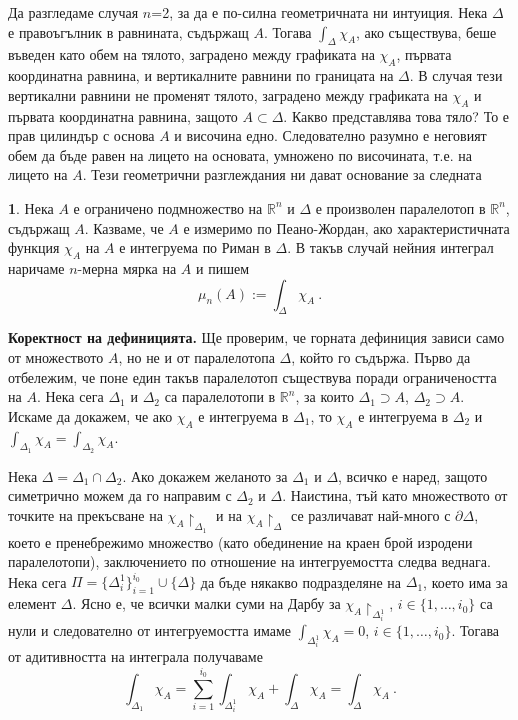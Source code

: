 \documentclass[11pt]{article}
\numberwithin{equation}{section}
\numberwithin{figure}{section}
\numberwithin{table}{section}
\theoremstyle{plain}
\theoremstyle{definition}
\newtheorem{defn}[thm]{\protect\definitionname}
\theoremstyle{remark}
\theoremstyle{definition}
\theoremstyle{remark}
\theoremstyle{plain}
\theoremstyle{definition}
\theoremstyle{definition}
\theoremstyle{plain}
\theoremstyle{plain}
\theoremstyle{plain}
\theoremstyle{definition}
\theoremstyle{plain}
\providecommand{\definitionname}{Дефиниция}
\newcommand*{\R}{\mathbb{R}}
\begin{document}
Да разгледаме случая $n$=2, за да е по-силна геометричната ни интуиция. Нека $\Delta$ е правоъгълник в равнината, съдържащ $A$. Тогава $\int_\Delta \chi_A$, ако съществува, беше въведен като обем на тялото, заградено между графиката на $\chi_A$, първата координатна равнина, и вертикалните равнини по границата на $\Delta$. В случая тези вертикални равнини не променят тялото, заградено между графиката на $\chi_A$ и първата координатна равнина, защото $A\subset\Delta$. Какво представлява това тяло? То е прав цилиндър с основа $A$ и височина едно. Следователно разумно е неговият обем да бъде равен на лицето на основата, умножено по височината, т.е. на лицето на $A$. Тези геометрични разглеждания ни дават основание за следната

\begin{defn}\label{def_measure}
Нека $A$ е ограничено подмножество на $\R^n$ и $\Delta$ е произволен паралелотоп в $\R^n$, съдържащ $A$. Казваме, че $A$ е измеримо по Пеано-Жордан, ако характеристичната функция $\chi_A$ на $A$ е интегруема по Риман в $\Delta$. В такъв случай нейния интеграл наричаме $n$-мерна мярка на $A$ и пишем
$$\mu_n(A):=\int_\Delta \chi_A \ .$$
\end{defn}

\textbf{Коректност на дефиницията.} Ще проверим, че горната дефиниция зависи само от множеството $A$, но не и от паралелотопа $\Delta$, който го съдържа. Първо да отбележим, че поне един такъв паралелотоп съществува поради ограничеността на $A$. Нека сега $\Delta_1$ и $\Delta_2$ са паралелотопи в $\R^n$, за които $\Delta_1\supset A$, $\Delta_2\supset A$. Искаме да докажем, че ако $\chi_A$ е интегруема в $\Delta_1$, то $\chi_A$ е интегруема в $\Delta_2$ и $\int_{\Delta_1} \chi_A =\int_{\Delta_2} \chi_A$.

Нека $\Delta=\Delta_1\cap \Delta_2$. Ако докажем желаното за $\Delta_1$ и $\Delta$, всичко е наред, защото симетрично можем да го направим с $\Delta_2$ и $\Delta$. Наистина, тъй като множеството от точките на прекъсване на $\chi_A\restriction_{\Delta_1}$ и на $\chi_A\restriction_{\Delta}$ се различават най-много с $\partial \Delta$, което е пренебрежимо множество (като обединение на краен брой изродени паралелотопи), заключението по отношение на интегруемостта следва веднага. Нека сега $\Pi=\{ \Delta^1_i\}_{i=1}^{i_0}\cup \{ \Delta\}$ да бъде някакво подразделяне на $\Delta_1$, което има за елемент $\Delta$. Ясно е, че всички малки суми на Дарбу за $\chi_A\restriction_{\Delta^1_i}$, $i\in \{1,\dots ,i_0\}$ са нули и следователно от интегруемостта имаме $\int_{\Delta^1_i}\chi_A=0$, $i\in \{1,\dots ,i_0\}$. Тогава от адитивността на интеграла получаваме
$$\int_{\Delta_1}\chi_A =\sum_{i=1}^{i_0}\int_{\Delta^1_i}\chi_A +\int_{\Delta}\chi_A =\int_{\Delta}\chi_A \ .$$
\end{document}
